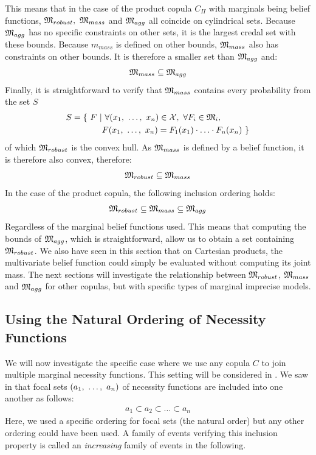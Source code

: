 This means that in the case of the product copula $C_\Pi$ with marginals being belief functions, $\mathfrak{M}_{robust},~\mathfrak{M}_{mass}$ and $\mathfrak{M}_{agg}$ all coincide on cylindrical sets. Because $\mathfrak{M}_{agg}$ has no specific constraints on other sets, it is the largest credal set with these bounds. Because $m_{mass}$ is defined on other bounds, $\mathfrak{M}_{mass}$ also has constraints on other bounds. It is therefore a smaller set than $\mathfrak{M}_{agg}$ and:
\begin{eqnarray*}
    \mathfrak{M}_{mass}\subseteq\mathfrak{M}_{agg}
\end{eqnarray*}
Finally, it is straightforward to verify that $\mathfrak{M}_{mass}$ contains every probability from the set $S$
\begin{align*}
    S=\{~F~|&~\forall (x_1, ~\ldots, ~ x_n)\in\mathcal{X},~\forall F_i\in\mathfrak{M}_i,\\
    &F(x_1, ~\ldots, ~ x_n)=F_1(x_1)\cdot\ldots\cdot F_n(x_n)~\}
\end{align*}
of which $\mathfrak{M}_{robust}$ is the convex hull. As $\mathfrak{M}_{mass}$ is defined by a belief function, it is therefore also convex, therefore:
\begin{eqnarray*}
    \mathfrak{M}_{robust}\subseteq\mathfrak{M}_{mass}
\end{eqnarray*}
In the case of the product copula, the following inclusion ordering holds:
\begin{align}
    \mathfrak{M}_{robust}\subseteq\mathfrak{M}_{mass}\subseteq\mathfrak{M}_{agg}
\end{align}
Regardless of the marginal belief functions used. This means that computing the bounds of $\mathfrak{M}_{agg}$, which is straightforward, allow us to obtain a set containing $\mathfrak{M}_{robust}$. We also have seen in this section that on Cartesian products, the multivariate belief function could simply be evaluated without computing its joint mass. The next sections will investigate the relationship between $\mathfrak{M}_{robust}$, $\mathfrak{M}_{mass}$ and $\mathfrak{M}_{agg}$ for other copulas, but with specific types of marginal imprecise models.

\subsection{Using the Natural Ordering of Necessity Functions}\label{sec:necessity_functions}
We will now investigate the specific case where we use any copula $C$ to join multiple marginal necessity functions. This setting will be considered in . We saw in  that focal sets $(a_1, ~\ldots, ~ a_n)$ of necessity functions are included into one another as follows:
\begin{align*}
    a_1\subset a_2\subset\ldots\subset a_n
\end{align*}
Here, we used a specific ordering for focal sets (the natural order) but any other ordering could have been used. A family of events verifying this inclusion property is called an \textit{increasing} family of events in the following. 

